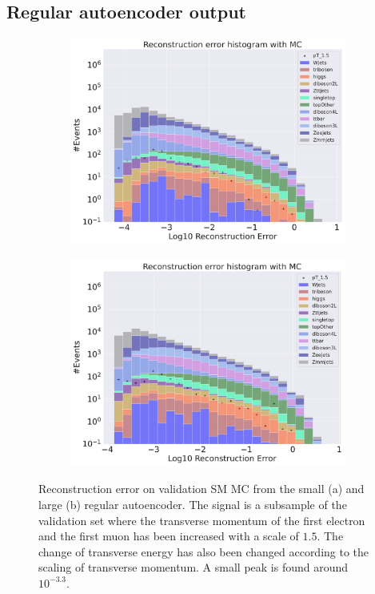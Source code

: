 \subsection*{Regular autoencoder output}
\begin{figure}[H]
    \centering
    \begin{subfigure}{.45\textwidth}
        \includegraphics[width=\textwidth]{Figures/AE_testing/small/b_data_recon_big_rm3_feats_sig_pT_1.5.pdf}
        \caption{ }
        \label{fig:ae_small_pt_1_5}
    \end{subfigure}
    \hfill 
    \begin{subfigure}{.45\textwidth}
        \includegraphics[width=\textwidth]{Figures/AE_testing/big/b_data_recon_big_rm3_feats_sig_pT_1.5.pdf}
        \caption{ }
        \label{fig:ae_big_pt_1_5}
    \end{subfigure}
    \hfill 
    \caption[AE | Reconstruction error $p_T$ altering of 1.5]{Reconstruction error on validation SM MC from the small (a) and large (b) regular autoencoder. The signal is a subsample of the validation 
    set where the transverse momentum of the first electron and the first muon has been increased with a scale of $1.5$. The change of transverse 
    energy has also been changed according to the scaling of transverse momentum. A small peak is found around $10^{-3.3}$. }
    \label{fig:ae_big_small_pt_1_5}
\end{figure}

